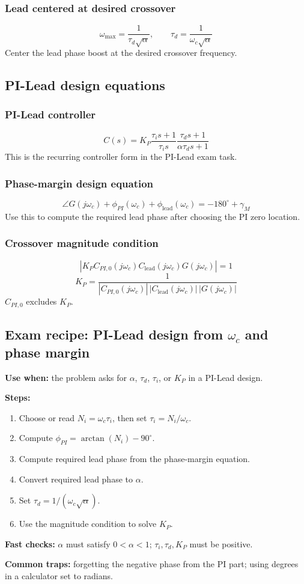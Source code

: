 \subsubsection{Lead centered at desired crossover}
\[
\omega_{\max}=\frac{1}{\tau_d\sqrt{\alpha}},\qquad
\tau_d=\frac{1}{\omega_c\sqrt{\alpha}}
\]
Center the lead phase boost at the desired crossover frequency.

\subsection{PI-Lead design equations}

\subsubsection{PI-Lead controller}
\[
C(s)=K_P\frac{\tau_i s+1}{\tau_i s}\frac{\tau_d s+1}{\alpha\tau_d s+1}
\]
This is the recurring controller form in the PI-Lead exam task.

\subsubsection{Phase-margin design equation}
\[
\angle G(j\omega_c)+\phi_{PI}(\omega_c)+\phi_{\mathrm{lead}}(\omega_c)
=-180^\circ+\gamma_M
\]
Use this to compute the required lead phase after choosing the PI zero location.

\subsubsection{Crossover magnitude condition}
\[
|K_PC_{PI,0}(j\omega_c)C_{\mathrm{lead}}(j\omega_c)G(j\omega_c)|=1
\]
\[
K_P=\frac{1}{|C_{PI,0}(j\omega_c)|\,|C_{\mathrm{lead}}(j\omega_c)|\,|G(j\omega_c)|}
\]
\(C_{PI,0}\) excludes \(K_P\).

\subsection{Exam recipe: PI-Lead design from \(\omega_c\) and phase margin}

\textbf{Use when:} the problem asks for \(\alpha\), \(\tau_d\), \(\tau_i\), or \(K_P\) in a PI-Lead design.

\textbf{Steps:}
\begin{enumerate}
\item Choose or read \(N_i=\omega_c\tau_i\), then set \(\tau_i=N_i/\omega_c\).
\item Compute \(\phi_{PI}=\arctan(N_i)-90^\circ\).
\item Compute required lead phase from the phase-margin equation.
\item Convert required lead phase to \(\alpha\).
\item Set \(\tau_d=1/(\omega_c\sqrt{\alpha})\).
\item Use the magnitude condition to solve \(K_P\).
\end{enumerate}

\textbf{Fast checks:} \(\alpha\) must satisfy \(0<\alpha<1\); \(\tau_i,\tau_d,K_P\) must be positive.

\textbf{Common traps:} forgetting the negative phase from the PI part; using degrees in a calculator set to radians.
